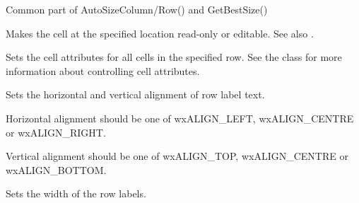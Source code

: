 \label{wxgridsetorcalccolumnsizes}


Common part of AutoSizeColumn/Row() and GetBestSize()



\label{wxgridsetorcalcrowsizes}




\label{wxgridsetreadonly}


Makes the cell at the specified location read-only or editable.
See also .



\label{wxgridsetrowattr}


Sets the cell attributes for all cells in the specified row.
See the  class for more information
about controlling cell attributes.



\label{wxgridsetrowlabelalignment}


Sets the horizontal and vertical alignment of row label text.

Horizontal alignment should be one of wxALIGN\_LEFT, wxALIGN\_CENTRE or wxALIGN\_RIGHT.

Vertical alignment should be one of wxALIGN\_TOP, wxALIGN\_CENTRE or wxALIGN\_BOTTOM.



\label{wxgridsetrowlabelsize}


Sets the width of the row labels.



\label{wxgridsetrowlabelvalue}

